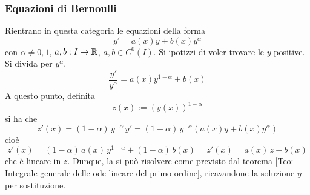 \subsubsection{Equazioni di Bernoulli}
Rientrano in questa categoria le equazioni della forma
\begin{equation} \label{Eq: Equazione di Bernoulli}
    y'=a(x)y+ b(x)y^{\alpha}
\end{equation}
con $\alpha \neq 0, 1$, $a, b: I \to \mathbb{R}$, $a,b \in C^0(I)$. Si ipotizzi di voler trovare le $y$ positive.
Si divida per $y^\alpha$.
\begin{equation}
    \frac{y'}{y^\alpha}=a(x)y^{1-\alpha}+ b(x)
\end{equation}
A questo punto, definita
\begin{equation}
    z(x):= \left(y(x)\right)^{1-\alpha}
\end{equation}
si ha che
\begin{equation}
    z'(x)=(1-\alpha)\, y^{-\alpha}\,y'=(1-\alpha)\,y^{-\alpha}\left( a(x)y+ b(x)y^{\alpha}\right)
\end{equation}
cioè
\begin{equation}
    z'(x)=(1-\alpha)\,a(x)\,y^{1-\alpha}+ (1-\alpha)\, b(x) = z'(x)=a(x)\,z+b(x)
\end{equation}
che è lineare in $z$. Dunque, la si può risolvere come previsto dal teorema \eqref{Teo: Integrale generale delle ode lineare del primo ordine}, ricavandone la soluzione $y$ per sostituzione.
